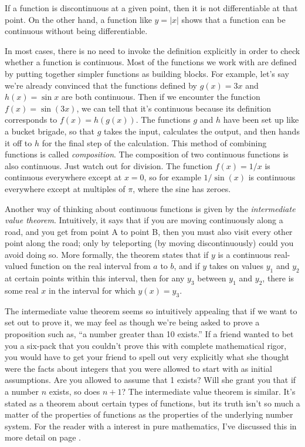 If a function is discontinuous at a given point, then it is not differentiable at that point.
On the other hand, a function like $y=|x|$ shows that a function can be continuous without
being differentiable.

In most cases, there is no need to invoke the definition explicitly in order to check whether
a function is continuous. Most of the functions we work with are defined by putting together
simpler functions as building blocks. For example, let's say we're already convinced that the
functions defined by $g(x)=3x$ and $h(x)=\sin x$ are both continuous. Then if we encounter the
function $f(x)=\sin(3x)$, we can tell that it's continuous because its definition corresponds
to $f(x)=h(g(x))$. The functions $g$ and $h$ have been set up like a bucket brigade, so that
$g$ takes the input, calculates the output, and then hands it off to $h$ for the final step
of the calculation. This method of combining functions is called \emph{composition}.
The composition of two continuous functions is also continuous. Just watch out for division.
The function $f(x)=1/x$ is continuous everywhere except at $x=0$, so for example $1/\sin(x)$
is continuous everywhere except at multiples of $\pi$, where the sine has zeroes.

Another way of thinking about continuous functions is given by the
\emph{intermediate value theorem}.
Intuitively, it says that if you are moving continuously along a road, 
and you get from point A to point B, then you must also visit every other point
along the road; only by teleporting (by moving discontinuously) could you
avoid doing so. More formally, the theorem states
that if $y$ is a continuous real-valued function on the real interval from $a$ to $b$,
and if $y$ takes on values $y_1$ and $y_2$ at certain points within this interval, then for any $y_3$ between $y_1$ and
$y_2$, there is some real $x$ in the interval for which $y(x)=y_3$.

The intermediate value theorem seems so intuitively appealing that if we want to
set out to prove it, we may feel as though we're being asked to prove a proposition such as, ``a number greater than 10 exists.''
If a friend wanted to bet you a six-pack that you couldn't prove this with complete mathematical rigor, you would have to
get your friend to spell out very explicitly what she thought were the facts about
integers that you were allowed to start with as initial assumptions. Are you allowed to assume that 1 exists?
Will she grant you that if a number $n$ exists, so does $n+1$?
The intermediate value theorem is similar. It's stated as a theorem about certain types
of functions, but its truth isn't so much a matter of the properties of functions as
the properties of the underlying number system. For the reader with a interest in pure
mathematics, I've discussed this in more detail on page \pageref{detour:intermediate-value}.\label{intermediate-value-ref-to-detour}

